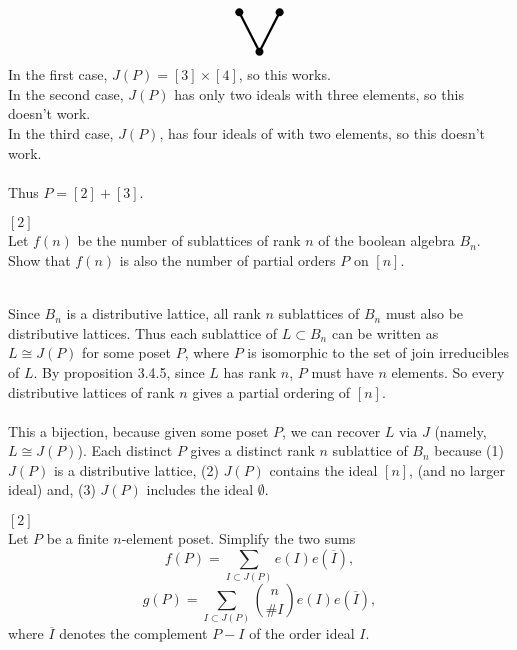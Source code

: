\documentclass{article}
\newenvironment{problem}[2][Problem]{\begin{trivlist}
\item[\hskip \labelsep {\bfseries #1}\hskip \labelsep {\bfseries #2.}]}{\end{trivlist}}
\newenvironment{solution}[1][Solution.]{\begin{trivlist}
\item[\hskip \labelsep {\bfseries #1}]}{\end{trivlist}}
\begin{document}
\begin{solution}
\[\begin{tikzpicture}
      \fill (3/2,0) circle (0.1);
      \fill (1,1) circle (0.1);
      \draw[ultra thick] (3/2,0)--(1,1);
      \fill (2,1) circle (0.1);
      \draw[ultra thick] (3/2,0)--(2,1);
    \end{tikzpicture}
  \]
  In the first case, $J(P) = [3] \times [4]$, so this works.
  \\
  In the second case, $J(P)$ has only two ideals with three elements, so this
  doesn't work.
  \\
  In the third case, $J(P)$, has four ideals of with two elements, so this
  doesn't work.
  \\~\\
  Thus $P = [2] + [3]$.
\end{solution}
\pagebreak
\begin{problem}{46 a} $[2]$ \\
  Let $f(n)$ be the number of sublattices of rank $n$ of the boolean algebra
  $B_n$. Show that $f(n)$ is also the number of partial orders $P$ on $[n]$.
\end{problem}

\begin{solution} \text{} \\
  Since $B_n$ is a distributive lattice, all rank $n$ sublattices of $B_n$ must
  also be distributive lattices. Thus each sublattice of $L \subset B_n$ can be
  written as $L \cong J(P)$ for some poset $P$, where $P$ is isomorphic to the
  set of join irreducibles of $L$. By proposition 3.4.5, since $L$ has rank $n$,
  $P$ must have $n$ elements. So every distributive lattices of rank $n$ gives
  a partial ordering of $[n]$.
  \\~\\
  This a bijection, because given some poset $P$, we can recover $L$ via $J$
  (namely, $L \cong J(P)$). Each distinct $P$ gives a distinct rank $n$
  sublattice of $B_n$ because
  (1) $J(P)$ is a distributive lattice,
  (2) $J(P)$ contains the ideal $[n]$,
  (and no larger ideal) and,
  (3) $J(P)$ includes the ideal $\emptyset$.
\end{solution}
\pagebreak
\begin{problem}{53} $[2]$ \\
  Let $P$ be a finite $n$-element poset. Simplify the two sums \[
    f(P) = \sum_{I \subset J(P)} e(I)e(\overline I),
  \] \[
    g(P) = \sum_{I \subset J(P)} \binom{n}{\#I} e(I)e(\overline I),
  \] where $\overline I$ denotes the complement $P - I$ of the order ideal $I$.
\end{problem}
\end{document}
